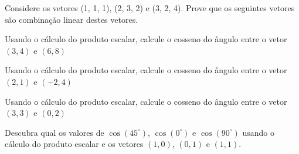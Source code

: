 \documentclass[12pt]{exam}
\begin{document}
\begin{questions}

\break

\question Considere os vetores 
    (1, 1, 1), 
    (2, 3, 2) e
    (3, 2, 4).
Prove que os seguintes vetores são 
combinação linear destes vetores.




\question Usando o cálculo do produto escalar, 
calcule o cosseno do ângulo entre o vetor 
$(3, 4)$ e $(6, 8)$


\question Usando o cálculo do produto escalar, 
calcule o cosseno do ângulo entre o vetor 
$(2, 1)$ e $(-2, 4)$


\question Usando o cálculo do produto escalar, 
calcule o cosseno do ângulo entre o vetor 
$(3, 3)$ e $(0, 2)$


\question Descubra qual os valores de 
$\cos(45^\circ)$,  
$\cos(0^\circ)$ e  
$\cos(90^\circ)$  
usando o cálculo do produto escalar e 
os vetores $(1, 0)$, $(0, 1)$ e $(1, 1)$.

\end{questions}
\end{document}
